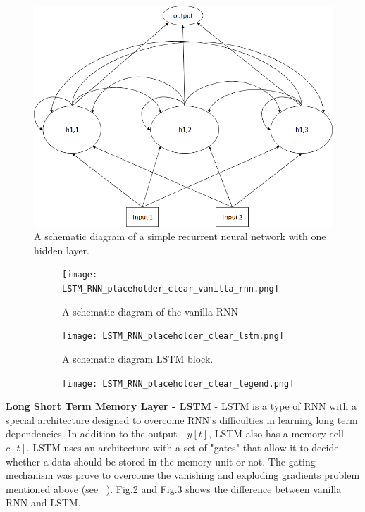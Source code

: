 \documentclass[
12pt, %
english, %
doublespacing, %
headsepline, %
]{MastersDoctoralThesis} %
\begin{document}
\begin{figure}
	\centering
	\includegraphics[width=0.7\linewidth]{Figures/RNN_Example}
	\caption{A schematic diagram of a simple recurrent neural network with one hidden layer.}
	\label{fig:RNN_Example}
\end{figure}



\begin{figure}
	\centering
	\begin{subfigure}[t]{0.3\textwidth}
		\centering
		\texttt{[image: LSTM\_RNN\_placeholder\_clear\_vanilla\_rnn.png]}
		\caption{A schematic diagram of the vanilla RNN}\label{fig:vanilla_rnn}
	\end{subfigure}
	\begin{subfigure}[t]{0.3\textwidth}
		\centering
		\texttt{[image: LSTM\_RNN\_placeholder\_clear\_lstm.png]}
		\caption{A schematic diagram LSTM block. \cite{ greff2017lstm}}\label{fig:lstm_sketch}
	\end{subfigure}
	\begin{subfigure}[t]{0.3\textwidth}
		\centering
		\texttt{[image: LSTM\_RNN\_placeholder\_clear\_legend.png]}

	\end{subfigure}

\end{figure}









\textbf{Long Short Term Memory Layer - LSTM} - LSTM is a type of RNN with a special architecture designed to overcome RNN's difficulties in learning long term dependencies. In addition to the output - $y[t]$, LSTM also has a memory cell - $c[t]$. LSTM uses an architecture with a set of "gates" that allow it to decide whether a data should be stored in the memory unit or not. The gating mechanism was prove to overcome the vanishing and exploding gradients problem mentioned above (see ~\cite{LSTM_origin}). Fig.\ref{fig:vanilla_rnn} and Fig.\ref{fig:lstm_sketch} shows the difference between vanilla RNN and LSTM.
\end{document}
